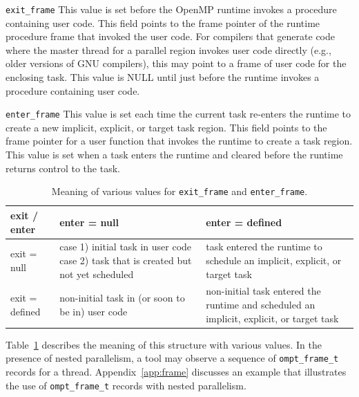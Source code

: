 \documentclass{article}
\begin{document}
\begin{description}
\item \verb|exit_frame|
     This value is set before the OpenMP runtime invokes a procedure containing user code. 
     This field points to the frame pointer of the runtime procedure frame that invoked the user code. 
     For compilers that generate code where the master thread for a parallel region invokes user code directly (e.g., older versions of GNU compilers), 
     this may point to a frame of user code for the enclosing task.
     This value is NULL until just before the runtime invokes a procedure containing user code. 
  
\item \verb|enter_frame|
     This value is set each time the current task re-enters the 
     runtime to create a new implicit, explicit, or target task region. This field 
     points to the frame pointer for a user function that invokes the runtime to create a task region.  
     This value is set when a task enters the runtime and cleared before the runtime returns control to the task.

\end{description}



\begin{table}
\begin{center}
\begin{tabular}{|l|p{2in}|p{2in}|}
\hline
exit / enter 	& enter = null										& enter = defined \\\hline\hline
exit = null		& case 1)  initial task in user code case 2) task that is created but not yet scheduled &  task entered the runtime to schedule an implicit, explicit, or target task \\\hline
exit = defined 	& non-initial task in (or soon to be in) user code							& non-initial task entered the runtime and scheduled an implicit, explicit, or target task\\\hline
\end{tabular}
\end{center}
\caption{Meaning of various values for {\tt exit\_frame} and {\tt enter\_frame}.}
\label{tab:frame}
\end{table}

\noindent
Table~\ref{tab:frame} describes the meaning of this structure with various values.
In the presence of nested parallelism, a tool may observe a sequence of \verb|ompt_frame_t| records for a thread. Appendix~\ref{app:frame} discusses  an example that illustrates the use of \verb|ompt_frame_t| records with nested parallelism.
\end{document}
